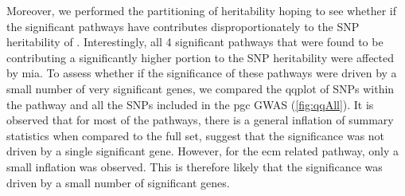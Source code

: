 Moreover, we performed the partitioning of heritability hoping to see whether if the significant pathways have contributes disproportionately to the \gls{SNP} heritability of .
Interestingly, all 4 significant pathways that were found to be contributing a significantly higher portion to the \gls{SNP} heritability were affected by \gls{mia}.
To assess whether if the significance of these pathways were driven by a small number of very significant genes, we compared the \gls{qqplot} of \glspl{SNP} within the pathway and all the \glspl{SNP} included in the \gls{pgc} \gls{GWAS} (\cref{fig:qqAll}).
It is observed that for most of the pathways, there is a general inflation of summary statistics when compared to the full set, suggest that the significance was not driven by a single significant gene.
However, for the \gls{ecm} related pathway, only a small inflation was observed. 
This is therefore likely that the significance was driven by a small number of significant genes. 

